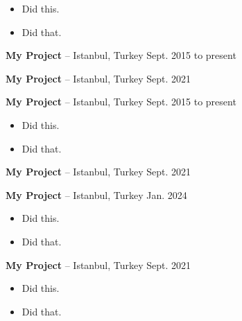 \documentclass[10pt, letterpaper]{article}
\newenvironment{highlights}{
        \begin{itemize}[
                topsep=0pt,
                partopsep=0pt,
                itemsep=0pt,
                leftmargin=10pt
            ]
    }{
        \end{itemize}
    } %
\begin{document}
        \begin{highlights}
        \item Did this.
        \item Did that.
        \end{highlights}


        \vspace{8pt}

        \textbf{My Project} -- Istanbul, Turkey \hfill Sept. 2015 to present



        \vspace{8pt}

        \textbf{My Project} -- Istanbul, Turkey \hfill Sept. 2021



        \vspace{8pt}

        \textbf{My Project} -- Istanbul, Turkey \hfill Sept. 2015 to present

        \begin{highlights}
        \item Did this.
        \item Did that.
        \end{highlights}


        \vspace{8pt}

        \textbf{My Project} -- Istanbul, Turkey \hfill Sept. 2021



        \vspace{8pt}

        \textbf{My Project} -- Istanbul, Turkey \hfill Jan. 2024

        \begin{highlights}
        \item Did this.
        \item Did that.
        \end{highlights}


        \vspace{8pt}

        \textbf{My Project} -- Istanbul, Turkey \hfill Sept. 2021

        \begin{highlights}
        \item Did this.
        \item Did that.
        \end{highlights}
\end{document}
